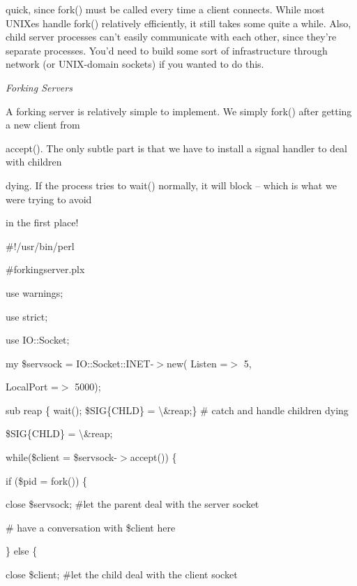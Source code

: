 \documentclass[a4paper,11pt]{book}
\begin{document}
\noindent quick, since fork() must be called every time a client connects. While most UNIXes handle fork() relatively efficiently, it still takes some quite a while. Also, child server processes can't easily communicate with each other, since they're separate processes. You'd need to build some sort of infrastructure through network (or UNIX-domain sockets) if you wanted to do this.

\noindent 

\noindent \textit{Forking Servers}

\noindent A  forking server is relatively  simple  to  implement.  We simply  fork() after  getting  a  new  client  from

\noindent accept().  The only subtle  part  is  that  we have  to  install  a  signal  handler  to  deal  with  children

\noindent dying.  If the  process tries to  wait() normally,  it  will  block  --  which  is  what we  were trying  to  avoid

\noindent in the first place!

\noindent 

\noindent \#!/usr/bin/perl

\noindent \#forkingserver.plx

\noindent use warnings;

\noindent use strict;

\noindent use IO::Socket;

\noindent 

\noindent my \$servsock = IO::Socket::INET-$>$new( Listen =$>$ 5,

\noindent LocalPort =$>$ 5000);

\noindent 

\noindent sub reap \{ wait(); \$SIG\{CHLD\} = \textbackslash \&reap;\} \# catch and handle children dying

\noindent \$SIG\{CHLD\} = \textbackslash \&reap;

\noindent 

\noindent 

\noindent while(\$client = \$servsock-$>$accept()) \{

\noindent if (\$pid = fork()) \{

\noindent close \$servsock; \#let the parent deal with the server socket

\noindent \# have a conversation with \$client here

\noindent \} else \{

\noindent close \$client; \#let the child deal with the client socket
\end{document}
